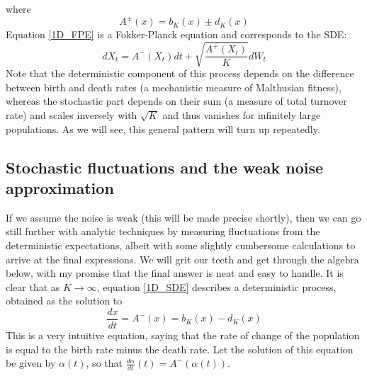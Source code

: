 where
\begin{equation*}
A^{\pm}(x) = b_K(x) \pm d_K(x)
\end{equation*}
Equation \eqref{1D_FPE} is a Fokker-Planck equation and corresponds to the SDE:
\begin{equation}
\label{1D_SDE}
dX_t = A^{-}(X_t)dt + \sqrt{\frac{A^{+}(X_t)}{K}}dW_t
\end{equation}
Note that the deterministic component of this process depends on the difference between birth and death rates (a mechanistic measure of Malthusian fitness), whereas the stochastic part depends on their sum (a measure of total turnover rate) and scales inversely with $\sqrt{K}$ and thus vanishes for infinitely large populations. As we will see, this general pattern will turn up repeatedly.

\subsection{Stochastic fluctuations and the weak noise approximation}\label{sec_1D_WNA}
If we assume the noise is weak (this will be made precise shortly), then we can go still further with analytic techniques by measuring fluctuations from the deterministic expectations, albeit with some slightly cumbersome calculations to arrive at the final expressions. We will grit our teeth and get through the algebra below, with my promise that the final answer is neat and easy to handle. It is clear that as $K \to \infty$, equation \eqref{1D_SDE} describes a deterministic process, obtained as the solution to
\begin{equation}
\label{1D_det_limit}
\frac{dx}{dt} = A^{-}(x) = b_{K}(x) - d_{K}(x)
\end{equation}
This is a very intuitive equation, saying that the rate of change of the population is equal to the birth rate minus the death rate. Let the solution of this equation  be given by $\alpha(t)$, so that $\frac{d{\alpha}}{dt}(t) = A^{-}(\alpha(t))$.

